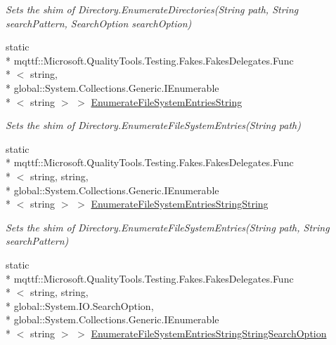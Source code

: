 \begin{DoxyCompactItemize}
\begin{DoxyCompactList}\small\item\em Sets the shim of Directory.\-Enumerate\-Directories(\-String path, String search\-Pattern, Search\-Option search\-Option)\end{DoxyCompactList}\item 
static \\*
mqttf\-::\-Microsoft.\-Quality\-Tools.\-Testing.\-Fakes.\-Fakes\-Delegates.\-Func\\*
$<$ string, \\*
global\-::\-System.\-Collections.\-Generic.\-I\-Enumerable\\*
$<$ string $>$ $>$ \hyperlink{class_system_1_1_i_o_1_1_fakes_1_1_shim_directory_a672b51b834f58096553f5fb9bfd4dab2}{Enumerate\-File\-System\-Entries\-String}
\begin{DoxyCompactList}\small\item\em Sets the shim of Directory.\-Enumerate\-File\-System\-Entries(\-String path)\end{DoxyCompactList}\item 
static \\*
mqttf\-::\-Microsoft.\-Quality\-Tools.\-Testing.\-Fakes.\-Fakes\-Delegates.\-Func\\*
$<$ string, string, \\*
global\-::\-System.\-Collections.\-Generic.\-I\-Enumerable\\*
$<$ string $>$ $>$ \hyperlink{class_system_1_1_i_o_1_1_fakes_1_1_shim_directory_a0c67f3e251abfa55a0c6ca2e461080e0}{Enumerate\-File\-System\-Entries\-String\-String}
\begin{DoxyCompactList}\small\item\em Sets the shim of Directory.\-Enumerate\-File\-System\-Entries(\-String path, String search\-Pattern)\end{DoxyCompactList}\item 
static \\*
mqttf\-::\-Microsoft.\-Quality\-Tools.\-Testing.\-Fakes.\-Fakes\-Delegates.\-Func\\*
$<$ string, string, \\*
global\-::\-System.\-I\-O.\-Search\-Option, \\*
global\-::\-System.\-Collections.\-Generic.\-I\-Enumerable\\*
$<$ string $>$ $>$ \hyperlink{class_system_1_1_i_o_1_1_fakes_1_1_shim_directory_aff236dcd06967693f8168a42b900804f}{Enumerate\-File\-System\-Entries\-String\-String\-Search\-Option}

\end{DoxyCompactItemize}
